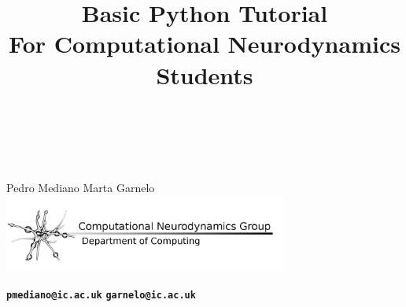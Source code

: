 \documentclass[xcolor=x11names, compress]{beamer}
\renewcommand{\(}{\begin{columns}}
\renewcommand{\)}{\end{columns}}
\newcommand{\<}[1]{\begin{column}{#1}}
\renewcommand{\>}{\end{column}}
\newcommand{\ver}[1]{\texttt{\textbf{#1}}}
\begin{document}
\begin{frame}[plain]
  \title{ {\fontsize{14}{1}\selectfont \bfseries Basic Python Tutorial} \\ \vspace{-3pt} {\fontsize{10}{1}\selectfont For Computational Neurodynamics Students} \\  }
\subtitle{ ~ }
\date{}
\vspace{5pt}
\titlepage
\vfill
\begin{center}

% 
% 
% 
% 
% 

  ~ \\
  
  \vfill
  {\large Pedro Mediano \hspace{30pt} Marta Garnelo}\\ \vspace{-8pt}
  {\includegraphics[width=0.7\textwidth]{logo3.png}}\\ \vspace{-10pt}


  \ver{pmediano@ic.ac.uk} \hspace{20pt} \ver{garnelo@ic.ac.uk}
\end{center}
\end{frame}


\end{document}
